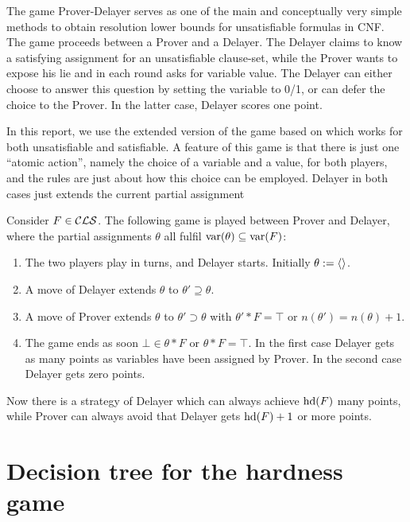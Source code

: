 \documentclass[12pt]{book}
\begin{document}
The game Prover-Delayer serves as one of the main and conceptually very simple methods to obtain resolution lower bounds for 
unsatisfiable formulas in CNF. The game proceeds between a Prover and a Delayer. The Delayer claims to know a satisfying
assignment for an unsatisfiable clause-set, while the Prover wants to expose his lie and in each round asks for variable value. 
The Delayer can either choose to answer this question by setting the variable to 0/1, or can defer the choice to the Prover.
In the latter case, Delayer scores one point.
 
In this report, we use the extended version of the game based on \cite{h5} which works for both unsatisfiable and satisfiable. 
A feature of this game is that there is just one “atomic action”, namely the choice of a variable and a value, for both players, 
and the rules are just about how this choice can be employed. Delayer in both cases just extends the current partial assignment

\begin{thm}\label{thm:hd=PI}
  \cite{h5} Consider $F \in \mathcal{CLS}$. The following game is played between Prover and Delayer, where the partial assignments $\theta$ all fulfil $\operatorname{var}(\theta) \subseteq \operatorname{var}(F)$:
  \begin{enumerate}
  \item The two players play in turns, and Delayer starts. Initially $\theta := \langle  \rangle$.
  \item A move of Delayer extends $\theta$ to $\theta' \supseteq \theta$.
  \item A move of Prover extends $\theta$ to $\theta' \supset \theta$ with $\theta' * F = \top$ or $n(\theta') = n(\theta) + 1$.
  \item The game ends as soon $\bot \in \theta * F$ or $\theta * F = \top$.
     In the first case Delayer gets as many points as variables have been assigned by Prover.
     In the second case Delayer gets zero points.
    \end{enumerate}
  Now there is a strategy of Delayer which can always achieve $\operatorname{hd}(F)$ many points, while Prover can always avoid that Delayer gets $\operatorname{hd}(F)+1$ or more points.
\end{thm}
\section{Decision tree for the hardness game}
\label{sec:game-charc}
\end{document}
